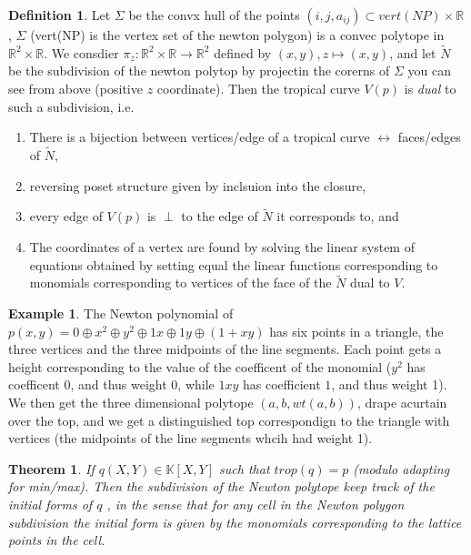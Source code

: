 \documentclass[12pt]{memoir}
\newtheorem{prototheorem}{Theorem}[section]
\newenvironment{theorem}
   {\begin{prototheorem}}
   {\end{prototheorem}}
\theoremstyle{definition}
\newtheorem{protoexample}{Example}[section]
\newenvironment{ex}
   {\begin{protoexample}}
   {\end{protoexample}}
\newtheorem{protodefinition}{Definition}[section]
\newenvironment{define}
   {\begin{protodefinition}}
   {\end{protodefinition}}
\def\RR{{\mathbb R}}
\def\KK{{\mathbb K}}
\begin{document}
\begin{define}
Let $\Sigma$ be the convx hull of the points $(i,j,a_{ij})\subset vert(NP)\times \RR$, $\Sigma$ (vert(NP) is the vertex set of the newton polygon) is a convec polytope in $\RR^2 \times \RR$. We consdier $\pi_z: \RR^2 \times \RR \rightarrow \RR^2$ defined by $(x,y), z \mapsto (x,y)$, and let $\tilde{N}$ be the subdivision of the newton polytop by projectin the corerns of $\Sigma$ you can see from above (positive $z$ coordinate). Then the tropical curve $V(p)$ is \emph{dual} to such a subdivision, i.e.

\begin{enumerate}
    \item There is a bijection between vertices/edge of a tropical curve $\leftrightarrow$ faces/edges of $\tilde{N}$,
    \item reversing poset structure given by inclsuion into the closure,
    \item every edge of $V(p)$ is $\perp$ to the edge of $\tilde{N}$ it corresponds to, and
    \item The coordinates of a vertex are found by solving the linear system of equations obtained by setting equal the linear functions corresponding to monomials corresponding to vertices of the face of the $\tilde{N}$ dual to $V$.
\end{enumerate}

\end{define}


\begin{ex}
  The Newton polynomial of $p(x,y) = 0 \oplus x^2 \oplus y^2 \oplus 1x \oplus 1y \oplus (1+xy)$ has six points in a triangle, the three vertices and the three midpoints of the line segments. Each point gets a height corresponding to the value of the coefficent of the monomial ($y^2$ has coefficent 0, and thus weight 0, while $1xy$ has coefficient $1$, and thus weight 1). We then get the three dimensional polytope $(a,b, wt(a,b))$, drape  acurtain over the top, and we get a distinguished top correspondign to the triangle with vertices (the midpoints of the line segments whcih had weight 1).
\end{ex}

\begin{theorem}
    If $q(X,Y)\in \KK[X,Y]$ such that $trop(q) = p $ (modulo adapting for min/max). Then the subdivision of the Newton polytope keep track of the initial forms of $q$ , in the sense that for any cell in the Newton polygon subdivision the initial form is given by the monomials corresponding to the lattice points in the cell.
\end{theorem}
\end{document}
